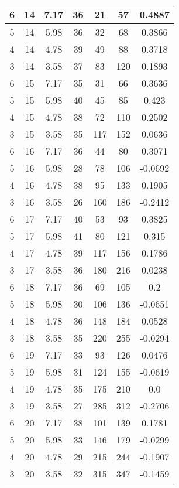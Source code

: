 \documentclass[letterpaper, 12pt]{article}
\begin{document}
\begin{longtable}{|c|c|c|c|c|c|c|}
\hline
6 & 14 & 7.17 & 36 & 21 & 57 & 0.4887 \\
\hline
5 & 14 & 5.98 & 36 & 32 & 68 & 0.3866 \\
\hline
4 & 14 & 4.78 & 39 & 49 & 88 & 0.3718 \\
\hline
3 & 14 & 3.58 & 37 & 83 & 120 & 0.1893 \\
\hline
6 & 15 & 7.17 & 35 & 31 & 66 & 0.3636 \\
\hline
5 & 15 & 5.98 & 40 & 45 & 85 & 0.423 \\
\hline
4 & 15 & 4.78 & 38 & 72 & 110 & 0.2502 \\
\hline
3 & 15 & 3.58 & 35 & 117 & 152 & 0.0636 \\
\hline
6 & 16 & 7.17 & 36 & 44 & 80 & 0.3071 \\
\hline
5 & 16 & 5.98 & 28 & 78 & 106 & -0.0692 \\
\hline
4 & 16 & 4.78 & 38 & 95 & 133 & 0.1905 \\
\hline
3 & 16 & 3.58 & 26 & 160 & 186 & -0.2412 \\
\hline
6 & 17 & 7.17 & 40 & 53 & 93 & 0.3825 \\
\hline
5 & 17 & 5.98 & 41 & 80 & 121 & 0.315 \\
\hline
4 & 17 & 4.78 & 39 & 117 & 156 & 0.1786 \\
\hline
3 & 17 & 3.58 & 36 & 180 & 216 & 0.0238 \\
\hline
6 & 18 & 7.17 & 36 & 69 & 105 & 0.2 \\
\hline
5 & 18 & 5.98 & 30 & 106 & 136 & -0.0651 \\
\hline
4 & 18 & 4.78 & 36 & 148 & 184 & 0.0528 \\
\hline
3 & 18 & 3.58 & 35 & 220 & 255 & -0.0294 \\
\hline
6 & 19 & 7.17 & 33 & 93 & 126 & 0.0476 \\
\hline
5 & 19 & 5.98 & 31 & 124 & 155 & -0.0619 \\
\hline
4 & 19 & 4.78 & 35 & 175 & 210 & 0.0 \\
\hline
3 & 19 & 3.58 & 27 & 285 & 312 & -0.2706 \\
\hline
6 & 20 & 7.17 & 38 & 101 & 139 & 0.1781 \\
\hline
5 & 20 & 5.98 & 33 & 146 & 179 & -0.0299 \\
\hline
4 & 20 & 4.78 & 29 & 215 & 244 & -0.1907 \\
\hline
3 & 20 & 3.58 & 32 & 315 & 347 & -0.1459 \\
\hline
\end{longtable}
\end{document}
